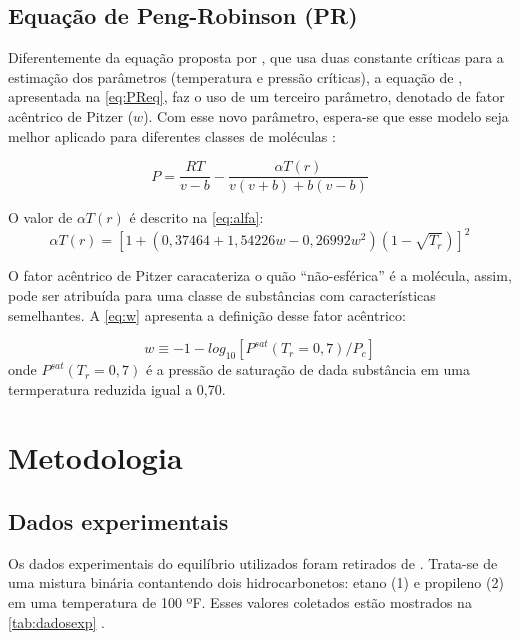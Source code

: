 \subsection{Equação de Peng-Robinson (PR)}
  
 Diferentemente da equação proposta por , que usa duas
 constante críticas para a estimação dos parâmetros (temperatura e pressão
 críticas), a equação de , apresentada na
 \autoref{eq:PReq}, faz o uso de um terceiro parâmetro, denotado de fator
 acêntrico de Pitzer ($w$). Com esse novo parâmetro, espera-se que esse modelo
 seja melhor aplicado para diferentes classes de moléculas \cite{Koretsky2013}:
  
  
  
 \begin{equation}\label{eq:PReq}
P = \frac{RT}{v - b} - \frac{\alpha T(r)}{v(v+b)+b(v-b)}
\end{equation} 

O valor de $\alpha T(r)$ é descrito na \autoref{eq:alfa}:
 \begin{equation}\label{eq:alfa}
\alpha T(r) = [1 +
 (0,37464+1,54226w-0,26992w^2)(1-\sqrt{T_r})]^2
\end{equation} 

 
 O fator acêntrico de Pitzer caracateriza o quão ``não-esférica'' é a molécula,
 assim, pode ser atribuída para uma classe de substâncias com
 características semelhantes. A \autoref{eq:w} apresenta a definição desse fator
 acêntrico:
 
  \begin{equation}\label{eq:w}
w \equiv -1 - log_{10}\left [ P^{sat} \left ( T_r = 0,7 \right )/P_c \right ]
\end{equation} 
onde $ P^{sat} \left ( T_r = 0,7 \right )$ é a pressão de saturação de dada
substância em uma termperatura reduzida igual a 0,70.



\section{Metodologia}

\subsection{Dados experimentais}
Os dados experimentais do equilíbrio utilizados foram retirados de . Trata-se de uma mistura binária contantendo dois
hidrocarbonetos: etano (1) e propileno (2) em uma temperatura de 100 ºF. Esses
valores coletados estão mostrados na \autoref{tab:dadosexp} .

